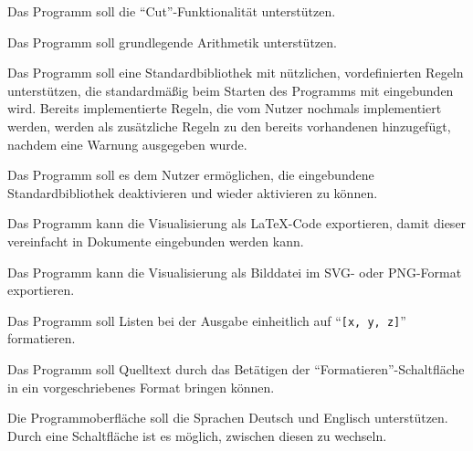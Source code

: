 \documentclass[parskip=full,11pt,twoside]{scrartcl}
\begin{document}

Das Programm soll die \enquote{Cut}-Funktionalität unterstützen.


Das Programm soll grundlegende Arithmetik unterstützen.


Das Programm soll eine Standardbibliothek mit nützlichen, vordefinierten Regeln unterstützen, die standardmäßig beim Starten des Programms mit eingebunden wird. Bereits implementierte Regeln, die vom Nutzer nochmals implementiert werden, werden als zusätzliche Regeln zu den bereits vorhandenen hinzugefügt, nachdem eine Warnung ausgegeben wurde.


Das Programm soll es dem Nutzer ermöglichen, die eingebundene Standardbibliothek deaktivieren und wieder aktivieren zu können.


Das Programm kann die Visualisierung als LaTeX-Code exportieren, damit dieser vereinfacht in Dokumente eingebunden werden kann.


Das Programm kann die Visualisierung als Bilddatei im SVG- oder PNG-Format exportieren.


Das Programm soll Listen bei der Ausgabe einheitlich auf \enquote{\texttt{[x, y, z]}} formatieren.


Das Programm soll Quelltext durch das Betätigen der \enquote{Formatieren}-Schaltfläche in ein vorgeschriebenes Format bringen können.


Die Programmoberfläche soll die Sprachen Deutsch und Englisch unterstützen. Durch eine Schaltfläche ist es möglich, zwischen diesen zu wechseln.

\end{document}

